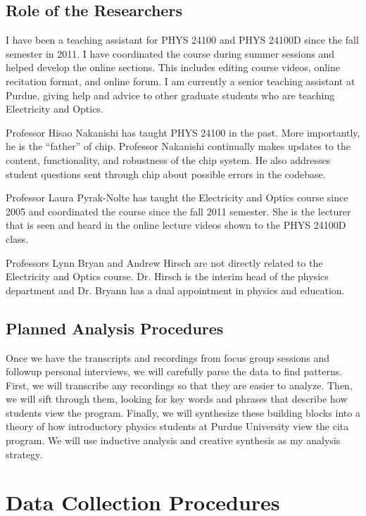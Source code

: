 \subsection{Role of the Researchers}

I have been a teaching assistant for PHYS 24100 and PHYS 24100D since the fall semester in 2011. I have coordinated the course during summer sessions and helped develop the online sections. This includes editing course videos, online recitation format, and online forum. I am currently a senior teaching assistant at Purdue, giving help and advice to other graduate students who are teaching Electricity and Optics.

Professor Hisao Nakanishi has taught PHYS 24100 in the past. More importantly, he is the ``father'' of \gls{chip}. Professor Nakanishi continually makes updates to the content, functionality, and robustness of the \gls{chip} system. He also addresses student questions sent through \gls{chip} about possible errors in the codebase.

Professor Laura Pyrak-Nolte has taught the Electricity and Optics course since 2005 and coordinated the course since the fall 2011 semester. She is the lecturer that is seen and heard in the online lecture videos shown to the PHYS 24100D class.

Professors Lynn Bryan and Andrew Hirsch are not directly related to the Electricity and Optics course. Dr. Hirsch is the interim head of the physics department and Dr. Bryann has a dual appointment in physics and education.

\subsection{Planned Analysis Procedures}

Once we have the transcripts and recordings from focus group sessions and followup personal interviews, we will carefully parse the data to find patterns. First, we will transcribe any recordings so that they are easier to analyze. Then, we will sift through them, looking for key words and phrases that describe how students view the program. Finally, we will synthesize these building blocks into a theory of how introductory physics students at Purdue University view the \gls{cita} program. We will use inductive analysis and creative synthesis as my analysis strategy.

\section{Data Collection Procedures}

